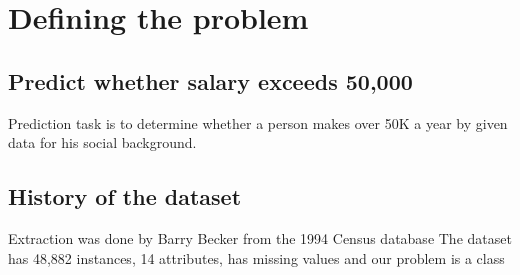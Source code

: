\chapter{Defining the problem}

\section{Predict whether salary exceeds 50,000}
Prediction task is to determine whether a person makes over 50K a year by given data for his social background. 

\section{History of the dataset}
Extraction was done by Barry Becker from the 1994 Census database
The dataset has 48,882 instances, 14 attributes, has missing values and our problem is a class

